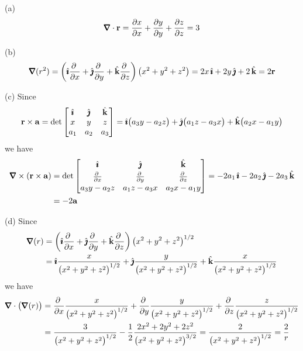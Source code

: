 \begin{solution} (a)
\begin{equation*}
\vnabla\cdot\vr 
=\pdiff{x}{x} 
  +\pdiff{y}{y} 
  +\pdiff{z}{z}
=3 
\end{equation*}

(b)
\begin{equation*}
\vnabla(r^2)
=\left(\hi\pdiff{}{x} 
  +\hj\pdiff{}{y} 
  +\hk\pdiff{}{z} \right)
\big(x^2+y^2+z^2\big)
=2x\,\hi +2y\,\hj +2\,\hk
=2\vr
\end{equation*}

(c) Since
\begin{equation*}
\mathbf{r}\times\mathbf{a} = \det\left[\begin{matrix}
                         \hat{\pmb{\imath}} & \hat{\pmb{\jmath}} & \hat{\mathbf{k}} \\
                          x  &  y  & z   \\
                         a_1 & a_2 & a_3 
                         \end{matrix}\right]
              =\hat{\pmb{\imath}}\big(a_3y-a_2z\big)
              +\hat{\pmb{\jmath}}\big(a_1z-a_3x\big)
              +\hat{\mathbf{k}}\big(a_2x-a_1y\big)
\end{equation*}
we have
\begin{align*}
\vnabla\times(\vr\times\va)
&= \det\left[\begin{matrix}\hi&\hj&\hk\\[0.03in] 
     \pdiff{}{x}&
        \pdiff{}{y}&
        \pdiff{}{z}\\[0.03in]
    a_3y-a_2z& a_1z-a_3x & a_2x-a_1y\end{matrix}\right] 
=-2a_1\,\hi -2a_2\,\hj -2a_3\,\hk \\
 &=-2\va
\end{align*}

(d) Since
\begin{align*}
\vnabla(r) &= \left(\hi\pdiff{}{x} 
  +\hj\pdiff{}{y} 
  +\hk\pdiff{}{z} \right) \big(x^2+y^2+z^2\big)^{1/2} \\
&=\hi\frac{x}{\big(x^2+y^2+z^2\big)^{1/2}}
  +\hj\frac{y}{\big(x^2+y^2+z^2\big)^{1/2}}
  +\hk\frac{x}{\big(x^2+y^2+z^2\big)^{1/2}}
\end{align*}
we have
\begin{align*}
\vnabla\cdot\big(\vnabla(r)\big)
&= \pdiff{}{x} \frac{x}{\big(x^2+y^2+z^2\big)^{1/2}}
   +\pdiff{}{y} \frac{y}{\big(x^2+y^2+z^2\big)^{1/2}}
   +\pdiff{}{z} \frac{z}{\big(x^2+y^2+z^2\big)^{1/2}} \\
&=  \frac{3}{\big(x^2+y^2+z^2\big)^{1/2}}
   -\frac{1}{2}\frac{2x^2+2y^2+2z^2}{\big(x^2+y^2+z^2\big)^{3/2}}
 =\frac{2}{\big(x^2+y^2+z^2\big)^{1/2}} 
 =\frac{2}{r}
\end{align*} 
\end{solution}

